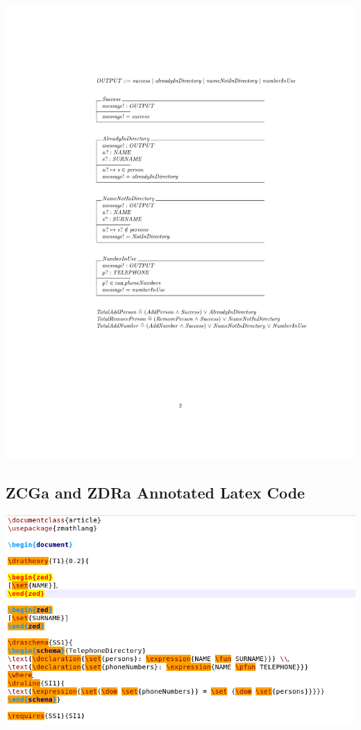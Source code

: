 \noindent \includegraphics[clip, trim=4cm 8cm 3cm 4.2cm]{examples/nonworkzcga/0comp2.pdf}

\subsection{ZCGa and ZDRa Annotated Latex Code}
\label{app:nonzcga1n2}
\includegraphics[scale=0.5]{examples/nonworkzcga/1n2imagea.png}

